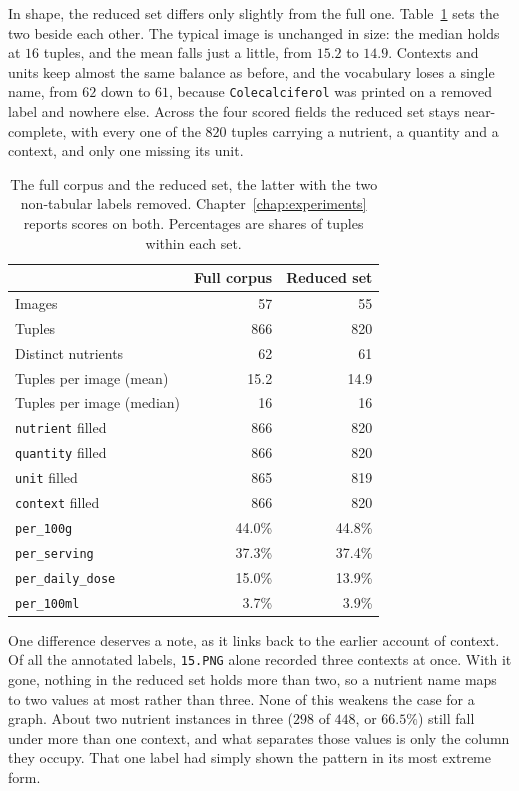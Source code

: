 In shape, the reduced set differs only slightly from the full one.
Table~\ref{tab:testset} sets the two beside each other. The typical image is
unchanged in size: the median holds at $16$ tuples, and the mean falls just a
little, from $15.2$ to $14.9$. Contexts and units keep almost the same balance
as before, and the vocabulary loses a single name, from $62$ down to $61$,
because \texttt{Colecalciferol} was printed on a removed label and nowhere else.
Across the four scored fields the reduced set stays near-complete, with every one
of the $820$ tuples carrying a nutrient, a quantity and a context, and only one
missing its unit.

\begin{table}[tb]
  \centering
  \caption[Full corpus versus reduced test set]{%
    The full corpus and the reduced set, the latter with the two non-tabular
    labels removed. Chapter~\ref{chap:experiments} reports scores on both.
    Percentages are shares of tuples within each set.}
  \label{tab:testset}
  \begin{tabular}{lrr}
    \toprule
                              & Full corpus & Reduced set \\
    \midrule
    Images                    & 57   & 55   \\
    Tuples                    & 866  & 820  \\
    Distinct nutrients        & 62   & 61   \\
    Tuples per image (mean)   & 15.2 & 14.9 \\
    Tuples per image (median) & 16   & 16   \\
    \addlinespace
    \texttt{nutrient} filled  & 866  & 820  \\
    \texttt{quantity} filled  & 866  & 820  \\
    \texttt{unit} filled      & 865  & 819  \\
    \texttt{context} filled   & 866  & 820  \\
    \addlinespace
    \texttt{per\_100g}        & 44.0\% & 44.8\% \\
    \texttt{per\_serving}     & 37.3\% & 37.4\% \\
    \texttt{per\_daily\_dose} & 15.0\% & 13.9\% \\
    \texttt{per\_100ml}       & 3.7\%  & 3.9\%  \\
    \bottomrule
  \end{tabular}
\end{table}

One difference deserves a note, as it links back to the earlier account of
context. Of all the annotated labels, \texttt{15.PNG} alone recorded three
contexts at once. With it gone, nothing in the reduced set holds more than two,
so a nutrient name maps to two values at most rather than three. None of this
weakens the case for a graph. About two nutrient instances in three ($298$ of
$448$, or $66.5\%$) still fall under more than one context, and what separates
those values is only the column they occupy. That one label had simply shown the
pattern in its most extreme form.

